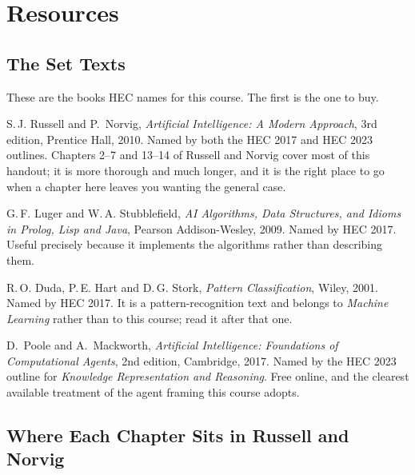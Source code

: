 \chapter{Resources}\label{app:resources}
\normalfigures

\section{The Set Texts}

These are the books HEC names for this course. The first is the one to buy.

\begin{tight}
  \item S.\,J. Russell and P.\ Norvig, \emph{Artificial Intelligence: A Modern
        Approach}, 3rd edition, Prentice Hall, 2010. Named by both the HEC 2017 and
        HEC 2023 outlines. Chapters 2--7 and 13--14 of Russell and Norvig cover
        most of this handout; it is more thorough and much longer, and it is the
        right place to go when a chapter here leaves you wanting the general case.
  \item G.\,F. Luger and W.\,A. Stubblefield, \emph{AI Algorithms, Data
        Structures, and Idioms in Prolog, Lisp and Java}, Pearson Addison-Wesley,
        2009. Named by HEC 2017. Useful precisely because it implements the
        algorithms rather than describing them.
  \item R.\,O. Duda, P.\,E. Hart and D.\,G. Stork, \emph{Pattern Classification},
        Wiley, 2001. Named by HEC 2017. It is a pattern-recognition text and
        belongs to \emph{Machine Learning} rather than to this course; read it
        after that one.
  \item D.\ Poole and A.\ Mackworth, \emph{Artificial Intelligence: Foundations of
        Computational Agents}, 2nd edition, Cambridge, 2017. Named by the HEC 2023
        outline for \emph{Knowledge Representation and Reasoning}. Free online, and
        the clearest available treatment of the agent framing this course adopts.
\end{tight}

\section{Where Each Chapter Sits in Russell and Norvig}

